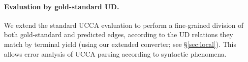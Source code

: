 \documentclass[11pt,a4paper]{article}
\begin{document}
\paragraph{Evaluation by gold-standard UD.}

We extend the standard UCCA evaluation to perform a fine-grained division
of both gold-standard and predicted edges,
according to the UD relations they match by terminal yield
(using our extended converter; see \S\ref{sec:local}).
This allows error analysis of UCCA parsing according to syntactic phenomena.


%


%

%
\end{document}
